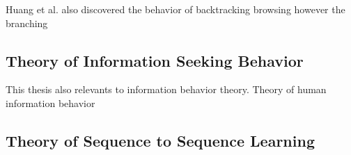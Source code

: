 Huang et al. \cite{huang2012no} also discovered the behavior of backtracking browsing
however the branching

\subsection{Theory of Information Seeking Behavior}
\label{sec:info-seek}

This thesis also relevants to information behavior theory.
Theory of human information behavior 

\subsection{Theory of Sequence to Sequence Learning}


\cleardoublepage